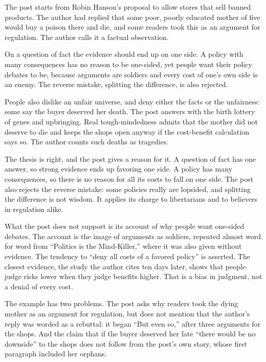 \begin{afterword}
\summaryhead

The post starts from Robin Hanson's proposal to allow stores that sell banned products. The author had replied that some poor, poorly educated mother of five would buy a poison there and die, and some readers took this as an argument for regulation. The author calls it a factual observation.

On a question of fact the evidence should end up on one side. A policy with many consequences has no reason to be one-sided, yet people want their policy debates to be, because arguments are soldiers and every cost of one's own side is an enemy. The reverse mistake, splitting the difference, is also rejected.

People also dislike an unfair universe, and deny either the facts or the unfairness: some say the buyer deserved her death. The post answers with the birth lottery of genes and upbringing. Real tough-mindedness admits that the mother did not deserve to die and keeps the shops open anyway if the cost-benefit calculation says so. The author counts such deaths as tragedies.

\responsehead

The thesis is right, and the post gives a reason for it. A question of fact has one answer, so strong evidence ends up favoring one side. A policy has many consequences, so there is no reason for all its costs to fall on one side. The post also rejects the reverse mistake: some policies really are lopsided, and splitting the difference is not wisdom. It applies its charge to libertarians and to believers in regulation alike.

What the post does not support is its account of why people want one-sided debates. The account is the image of arguments as soldiers, repeated almost word for word from ``Politics is the Mind-Killer,'' where it was also given without evidence. The tendency to ``deny all costs of a favored policy'' is asserted. The closest evidence, the study the author cites ten days later, shows that people judge risks lower when they judge benefits higher. That is a bias in judgment, not a denial of every cost.

The example has two problems. The post asks why readers took the dying mother as an argument for regulation, but does not mention that the author's reply was worded as a rebuttal: it began ``But even so,'' after three arguments for the shops. And the claim that if the buyer deserved her fate ``there would be no downside'' to the shops does not follow from the post's own story, whose first paragraph included her orphans.


\end{afterword}
